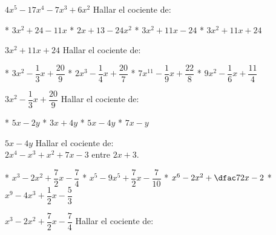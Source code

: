 $4x^5-17x^4-7x^3+6x^2$
Hallar el cociente de:
\begin{figure}[h]
\end{figure}
\begin{enum}
  * $3x^2+24-11x$
  * $2x+13-24x^2$
  * $3x^2+11x-24$
  * $3x^2+11x+24$
\end{enum}
$3x^2+11x+24$
Hallar el cociente de:
\begin{figure}[h]
\end{figure}
\begin{enum}
  * $3x^2-\dfrac13x+\dfrac{20}{9}$
  * $2x^3-\dfrac14x+\dfrac{20}{7}$
  * $7x^{11}-\dfrac19x+\dfrac{22}{8}$
  * $9x^2-\dfrac16x+\dfrac{11}{4}$
\end{enum}
$3x^2-\dfrac13x+\dfrac{20}{9}$
Hallar el cociente de:
\begin{figure}[h]
\end{figure}
\begin{enum}
  * $5x-2y$
  * $3x+4y$
  * $5x-4y$
  * $7x-y$
\end{enum}
$5x-4y$
Hallar el cociente de: \\
$2x^4-x^3+x^2+7x-3$ entre $2x+3$.
\begin{enum}
  * $x^3-2x^2+\dfrac72x-\dfrac74$
  * $x^5-9x^5+\dfrac72x-\dfrac{7}{10}$
  * $x^6-2x^2+\dfac72x-2$
  * $x^9-4x^3+\dfrac12x-\dfrac53$
\end{enum}
$x^3-2x^2+\dfrac72x-\dfrac74$
Hallar el cociente de:
\begin{figure}[h]
\end{figure}
